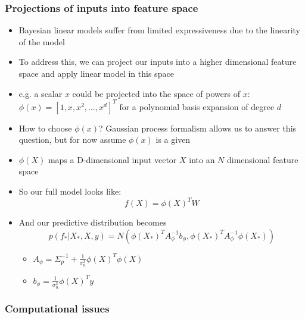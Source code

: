 \documentclass[12pt]{article}
\begin{document}
\subsubsection{Projections of inputs into feature space}
\begin{itemize}
    \item Bayesian linear models suffer from limited expressiveness due to the linearity of the model
    \item To address this, we can project our inputs into a higher dimensional feature space and apply linear model in this space
    \item e.g. a scalar $x$ could be projected into the space of powers of $x$: $\phi(x) = [1, x, x^2, \ldots, x^d]^T$ for a polynomial basis expansion of degree $d$
    \item How to choose $\phi(x)$? Gaussian process formalism allows us to answer this question, but for now assume $\phi(x)$ is a given
    \item $\phi(X)$ maps a D-dimensional input vector $X$ into an $N$ dimensional feature space
    \item So our full model looks like:
\begin{equation}
    f(X) = \phi(X)^T W
\end{equation}
    \item And our predictive distribution becomes
\begin{equation}
    p(f_*|X_*,X,y) = N(\phi(X_*)^TA_{\phi}^{-1}b_{\phi} , \phi(X_*)^TA_{\phi}^{-1}\phi(X_*))
\end{equation}
    \begin{itemize}
        \item $A_{\phi} = \Sigma_p^{-1} + \frac{1}{\sigma^2_n}\phi(X)^T\phi(X)$
        \item $b_{\phi} = \frac{1}{\sigma^2_n}\phi(X)^Ty$
    \end{itemize}
\end{itemize}


\subsubsection{Computational issues}
\end{document}
